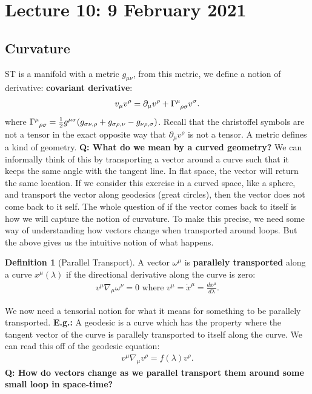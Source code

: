 \documentclass[11pt]{article}
\newcommand{\grmetric}[0]{g_{\mu \nu}}
\theoremstyle{definition}
\newtheorem{definition}{Definition}[section]
\begin{document}
\section{Lecture 10: 9 February 2021}
\subsection{Curvature}
ST is a manifold with a metric \( \grmetric \), from this metric, we define a notion of derivative: \textbf{covariant derivative}: 
\begin{align*}
	v_\mu v^\rho = \partial_\mu v^\rho + \tensor{\Gamma}{^{\mu}_{\rho \sigma}} v^\sigma. 
\end{align*}
where \(  \tensor{\Gamma}{^{\mu}_{\rho \sigma}} = \frac{1}{2} g^{\mu \sigma} (g_{\sigma \nu, \rho} + g_{\sigma \rho, \nu} - g_{\nu \rho, \sigma} ) \). Recall that the christoffel symbols are not a tensor in the exact opposite way that \( \partial_\mu v^\rho \) is not a tensor. A metric defines a kind of geometry. 
\newline
\newline
\textbf{Q: What do we mean by a curved geometry?}
\newline
We can informally think of this by transporting a vector around a curve such that it keeps the same angle with the tangent line. In flat space, the vector will return the same location. If we consider this exercise in a curved space, like a sphere, and transport the vector along geodesics (great circles), then the vector does not come back to it self. The whole question of if the vector comes back to itself is how we will capture the notion of curvature. 
\newline
\newline
To make this precise, we need some way of understanding how vectors change when transported around loops. But the above gives us the intuitive notion of what happens. 
\begin{definition}[Parallel Transport]
	A vector \( \omega^\mu \) is \textbf{parallely transported} along a curve \( x^\mu (\lambda) \) if the directional derivative along the curve is zero: 
	\begin{align*}
		v^\mu \nabla_\mu \omega^\nu = 0 \text{ where } v^\mu = \dot{x}^\mu = \frac{dx^\mu}{d \lambda}.
	\end{align*}
\end{definition}
We now need a tensorial notion for what it means for something to be parallely transported. 
\newline
\newline
\textbf{E.g.:} A geodesic is a curve which has the property where the tangent vector of the curve is parallely transported to itself along the curve. We can read this off of the geodesic equation: 
\begin{align*}
	v^\mu \nabla_\mu v^\rho = f(\lambda) v^\rho.
\end{align*}
\textbf{Q: How do vectors change as we parallel transport them around some small loop in space-time?}
\end{document}
